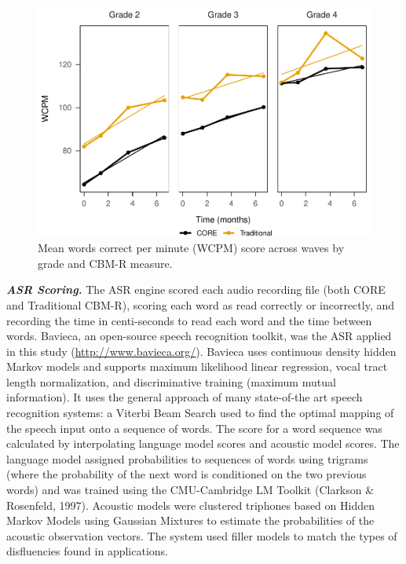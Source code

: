 \documentclass[
  english,
  man, fleqn, noextraspace]{apa6}
\begin{document}
\begin{center}
\begin{ThreePartTable}
\end{ThreePartTable}
\end{center}



\begin{figure}
\centering
\includegraphics{conseq_validity_manusript_files/figure-latex/fig-means-1.pdf}
\caption{\label{fig:fig-means}Mean words correct per minute (WCPM) score across waves by grade and CBM-R measure.}
\end{figure}

\textbf{\emph{ASR Scoring.}} The ASR engine scored each audio recording file (both CORE and Traditional CBM-R), scoring each word as read correctly or incorrectly, and recording the time in centi-seconds to read each word and the time between words. Bavieca, an open-source speech recognition toolkit, was the ASR applied in this study (\url{http://www.bavieca.org/}). Bavieca uses continuous density hidden Markov models and supports maximum likelihood linear regression, vocal tract length normalization, and discriminative training (maximum mutual information). It uses the general approach of many state-of-the art speech recognition systems: a Viterbi Beam Search used to find the optimal mapping of the speech input onto a sequence of words. The score for a word sequence was calculated by interpolating language model scores and acoustic model scores. The language model assigned probabilities to sequences of words using trigrams (where the probability of the next word is conditioned on the two previous words) and was trained using the CMU-Cambridge LM Toolkit (Clarkson \& Rosenfeld, 1997). Acoustic models were clustered triphones based on Hidden Markov Models using Gaussian Mixtures to estimate the probabilities of the acoustic observation vectors. The system used filler models to match the types of disfluencies found in applications.
\end{document}
